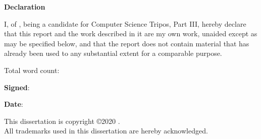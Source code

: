 \newpage
{\Huge \bf Declaration}

\vspace{24pt} 

I, \authorname of \authorcollege, being a candidate for Computer Science Tripos, Part III, hereby declare that this report and the work described in it are my own work, unaided except as may be specified below, and that the report does not contain material that has already been used to any substantial extent for a comparable purpose.

\vspace{24pt}
Total word count: 

\vspace{60pt}
\textbf{Signed}: 

\vspace{12pt}
\textbf{Date}:


\vfill

This dissertation is copyright \copyright 2020 \authorname. 
\\
All trademarks used in this dissertation are hereby acknowledged.



\newpage
\vspace*{\fill}
